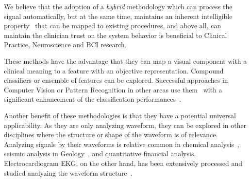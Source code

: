 \documentclass[brainsci,article,submit,moreauthors,pdftex,10pt,a4paper]{mdpi}
\begin{document}
We believe that the adoption of a \textit{hybrid} methodology which can process the signal automatically, but at the same time, maintains an inherent intelligible property~\citep{j2018challenge} that can be mapped to existing procedures, and above all, can maintain the clinician trust on the system behavior is beneficial to Clinical Practice, Neuroscience and BCI research. 

These methods have the advantage that they can map a visual component with a clinical meaning to a feature with an objective representation. Compound classifiers or ensemble of features can be explored.  Successful approaches in Computer Vision or Pattern Recognition in other areas use them~\citep{Criminisi2013} with a significant enhancement of the classification performances~\citep{Gu2012}.


Another benefit of these methodologies is that they have a potential universal applicability.  As they are only analyzing waveform, they can be explored in other disciplines where the structure or shape of the waveform is of relevance.  Analyzing signals by their waveforms is relative common in chemical analysis~\citep{Skoog2000}, seismic analysis in Geology~\citep{Owens1984}, and quantitative financial analysis.  Electrocardiogram EKG, on the other hand, has been extensively processed and studied analyzing the waveform structure~\citep{Stockman1976}.


%
%
%
%
\end{document}
